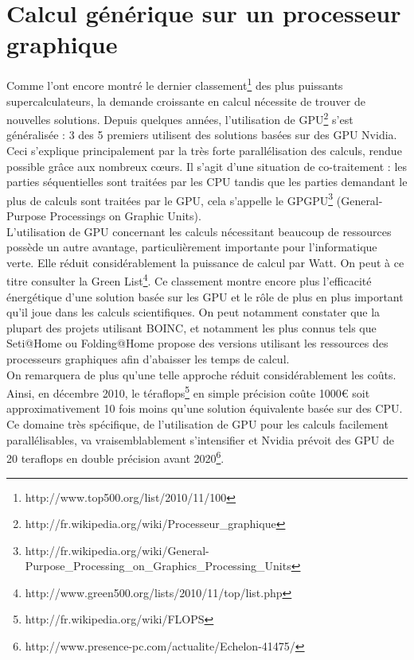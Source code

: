 \documentclass[a4paper,11pt,french]{article}
\begin{document}
\section{Calcul générique sur un processeur graphique}
Comme l’ont encore montré le dernier classement\footnote{\textsf{http://www.top500.org/list/2010/11/100}} des plus puissants supercalculateurs, la demande croissante en calcul nécessite de trouver de nouvelles solutions. Depuis quelques années, l’utilisation de GPU\footnote{\textsf{http://fr.wikipedia.org/wiki/Processeur\_{}graphique}} s’est généralisée : 3 des 5 premiers utilisent des solutions basées sur des GPU Nvidia. Ceci s’explique principalement par la très forte parallélisation des calculs, rendue possible grâce aux nombreux cœurs. Il s’agit d’une situation de co-traitement : les parties séquentielles sont traitées par les CPU tandis que les parties demandant le plus de calculs sont traitées par le GPU, cela s’appelle le GPGPU\footnote{\textsf{http://fr.wikipedia.org/wiki/General-Purpose\_{}Processing\_{}on\_{}Graphics\_{}Processing\_{}Units}} (General-Purpose Processings on Graphic Units).\\

L'utilisation de GPU concernant les calculs nécessitant beaucoup de ressources possède un autre avantage, particulièrement importante pour l'informatique verte. Elle réduit considérablement la puissance de calcul par Watt. On peut à ce titre consulter la Green List\footnote{\textsf{http://www.green500.org/lists/2010/11/top/list.php}}. Ce classement montre encore plus l’efficacité énergétique d’une solution basée sur les GPU et le rôle de plus en plus important qu'il joue dans les calculs scientifiques. On peut notamment constater que la plupart des projets utilisant BOINC, et notamment les plus connus tels que Seti@Home ou Folding@Home propose des versions utilisant les ressources des processeurs graphiques afin d'abaisser les temps de calcul.\\

On remarquera de plus qu’une telle approche réduit considérablement les coûts. Ainsi, en décembre 2010, le téraflops\footnote{\textsf{http://fr.wikipedia.org/wiki/FLOPS}} en simple précision coûte 1000\euro{}  soit approximativement 10 fois moins qu’une solution équivalente basée sur des CPU.\\

Ce domaine très spécifique, de l'utilisation de GPU pour les calculs facilement parallélisables, va vraisemblablement s’intensifier et Nvidia prévoit des GPU de 20 teraflops en double précision avant 2020\footnote{\textsf{http://www.presence-pc.com/actualite/Echelon-41475/}}.\\
\end{document}
